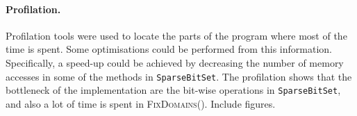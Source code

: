\documentclass[a4paper,11pt]{article}
\newcommand{\Todo}[1]{{\color{blue}#1}}
\newcommand{\SparseBitSet}{\texttt{SparseBitSet}}
\def\FixDomains{\textsc{FixDomains}}
\numberwithin{equation}{section}
\begin{document}
\paragraph{Profilation.} Profilation tools were used to locate the parts of
the program where most of the time is spent. Some optimisations could
be performed from this information. Specifically, a speed-up could be
achieved by decreasing the number of memory accesses in some of the
methods in \SparseBitSet. The profilation shows that the bottleneck 
of the implementation are the bit-wise operations in \SparseBitSet,
and also a lot of time is spent in \FixDomains().
\Todo{Include figures}.




\end{document}
